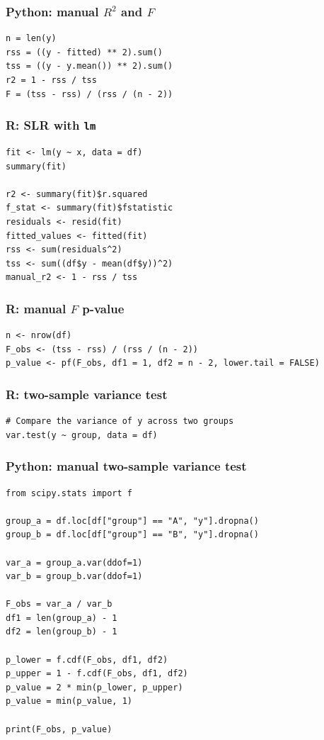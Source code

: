 \subsubsection*{Python: manual \(R^2\) and \(F\)}

\begin{verbatim}
n = len(y)
rss = ((y - fitted) ** 2).sum()
tss = ((y - y.mean()) ** 2).sum()
r2 = 1 - rss / tss
F = (tss - rss) / (rss / (n - 2))
\end{verbatim}

\subsubsection*{R: SLR with \texttt{lm}}

\begin{verbatim}
fit <- lm(y ~ x, data = df)
summary(fit)

r2 <- summary(fit)$r.squared
f_stat <- summary(fit)$fstatistic
residuals <- resid(fit)
fitted_values <- fitted(fit)
rss <- sum(residuals^2)
tss <- sum((df$y - mean(df$y))^2)
manual_r2 <- 1 - rss / tss
\end{verbatim}

\subsubsection*{R: manual \(F\) p-value}

\begin{verbatim}
n <- nrow(df)
F_obs <- (tss - rss) / (rss / (n - 2))
p_value <- pf(F_obs, df1 = 1, df2 = n - 2, lower.tail = FALSE)
\end{verbatim}

\subsubsection*{R: two-sample variance test}

\begin{verbatim}
# Compare the variance of y across two groups
var.test(y ~ group, data = df)
\end{verbatim}

\subsubsection*{Python: manual two-sample variance test}

\begin{verbatim}
from scipy.stats import f

group_a = df.loc[df["group"] == "A", "y"].dropna()
group_b = df.loc[df["group"] == "B", "y"].dropna()

var_a = group_a.var(ddof=1)
var_b = group_b.var(ddof=1)

F_obs = var_a / var_b
df1 = len(group_a) - 1
df2 = len(group_b) - 1

p_lower = f.cdf(F_obs, df1, df2)
p_upper = 1 - f.cdf(F_obs, df1, df2)
p_value = 2 * min(p_lower, p_upper)
p_value = min(p_value, 1)

print(F_obs, p_value)
\end{verbatim}

